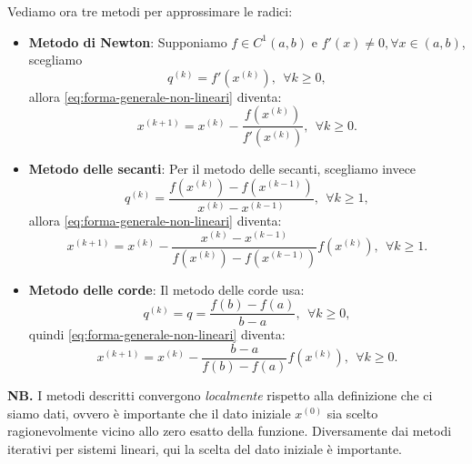 Vediamo ora tre metodi per approssimare le radici:
\begin{itemize}
	\item \textbf{Metodo di Newton}:
		Supponiamo $f\in C^{1}( a,b)$ e $f'(x)\neq 0, \forall x \in (a,b)$, scegliamo
		\begin{equation*}
		q^{(k)} =f'\left( x^{(k)}\right) ,\ \ \forall k\geqslant 0,
		\end{equation*}
		allora \eqref{eq:forma-generale-non-lineari} diventa:
		\begin{equation*}
		x^{( k+1)} =x^{(k)} -\frac{f\left( x^{(k)}\right)}{f'\left( x^{(k)}\right)} ,\ \ \forall k\geqslant 0.
		\end{equation*}
	\item \textbf{Metodo delle secanti}:
		Per il metodo delle secanti, scegliamo invece
		\begin{equation*}
		q^{(k)} =\frac{f\left( x^{(k)}\right) -f\left( x^{(k-1)}\right)}{x^{(k)} -x^{(k-1)}} ,\ \ \forall k\geqslant 1,
		\end{equation*}
		allora \eqref{eq:forma-generale-non-lineari} diventa:
		\begin{equation*}
		x^{(k+1)} =x^{(k)} -\frac{x^{(k)} -x^{(k-1)}}{f\left( x^{(k)}\right) -f\left( x^{(k-1)}\right)} f\left( x^{(k)}\right) ,\ \ \forall k\geqslant 1.
		\end{equation*}
	\item \textbf{Metodo delle corde}:
		Il metodo delle corde usa:
		\begin{equation*}
		q^{(k)} =q=\frac{f(b)-f(a)}{b-a} ,\ \ \forall k\geqslant 0,
		\end{equation*}
		quindi \eqref{eq:forma-generale-non-lineari} diventa:
		\begin{equation*}
		x^{(k+1)} =x^{(k)} -\frac{b-a}{f(b)-f(a)} f\left( x^{(k)}\right) ,\ \ \forall k\geqslant 0.
		\end{equation*}
\end{itemize}

\textbf{NB.}
I metodi descritti convergono \textit{localmente} rispetto alla definizione che ci siamo dati, ovvero è importante che il dato iniziale $x^{(0)}$ sia scelto ragionevolmente vicino allo zero esatto della funzione. Diversamente dai metodi iterativi per sistemi lineari, qui la scelta del dato iniziale è importante.

